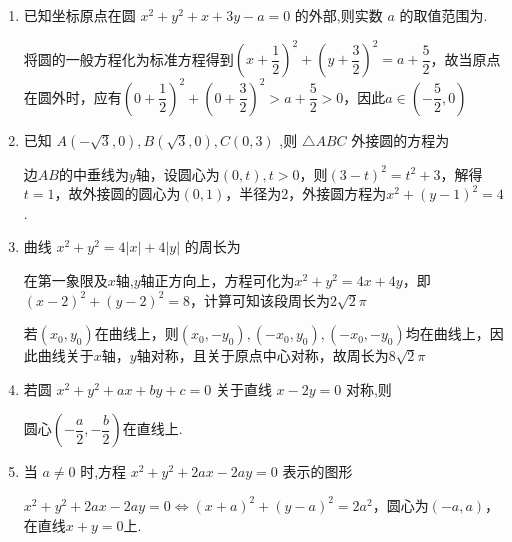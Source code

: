 \begin{enumerate}
\begin{jieda}
        因此半径的最大值为$\sqrt{2}$，所以面积最大值为$2\pi$
    \end{jieda}

    \item 已知坐标原点在圆 ${x}^{2} + {y}^{2} + x + {3y} - a = 0$ 的外部,则实数 $a$ 的取值范围为.
    \begin{jieda}
        将圆的一般方程化为标准方程得到$\left(x + \dfrac{1}{2}\right)^2 + \left(y + \dfrac{3}{2}\right)^2 = a + \dfrac{5}{2}$，故当原点在圆外时，应有$\left(0 + \dfrac{1}{2}\right)^2 + \left(0 + \dfrac{3}{2}\right)^2 > a + \dfrac{5}{2} > 0$，因此$a \in \left(-\dfrac{5}{2},0\right)$
    \end{jieda}

    \item 已知 $A\left( {-\sqrt{3},0}\right) ,B\left( {\sqrt{3},0}\right) ,C\left( {0,3}\right)$ ,则 $\bigtriangleup  {{ABC}}$ 外接圆的方程为
    \begin{jieda}
        边$AB$的中垂线为$y$轴，设圆心为$(0, t), t > 0$，则$(3-t)^2 = t^2 + 3$，解得$t = 1$，故外接圆的圆心为$(0, 1)$，半径为$2$，外接圆方程为$x^2+(y-1)^2=4$.
    \end{jieda}

    \item 曲线 ${x}^{2} + {y}^{2} = 4\left| x\right|  + 4\left| y\right|$ 的周长为
    \begin{jieda}
        在第一象限及$x$轴,$y$轴正方向上，方程可化为${x}^{2} + {y}^{2} = 4x+4y$，即$(x-2)^2+(y-2)^2 = 8$，计算可知该段周长为$2\sqrt{2}\pi$

        若$(x_0, y_0)$在曲线上，则$(x_0, -y_0), (-x_0, y_0), (-x_0, -y_0)$均在曲线上，因此曲线关于$x$轴，$y$轴对称，且关于原点中心对称，故周长为$8\sqrt{2}\pi$
    \end{jieda}

    \item 若圆 ${x}^{2} + {y}^{2} + {ax} + {by} + c = 0$ 关于直线 $x - {2y} = 0$ 对称,则
    \begin{jieda}
        圆心$\left(-\dfrac{a}{2}, -\dfrac{b}{2}\right)$在直线上.
    \end{jieda}

    \item 当 $a \neq  0$ 时,方程 ${x}^{2} + {y}^{2} + {2ax} - {2ay} = 0$ 表示的图形
    \begin{jieda}
        ${x}^{2} + {y}^{2} + {2ax} - {2ay} = 0 \Longleftrightarrow (x+a)^2+(y-a)^2 = 2a^2$，圆心为$(-a, a)$，在直线$x + y = 0$上.
    \end{jieda}



\end{enumerate}
